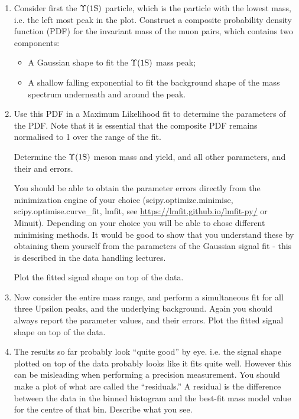 \begin{enumerate}
\item Consider first the $\Upsilon \rm (1S)$ particle, which is the particle with the lowest mass, i.e. the left most  peak in the plot. Construct a composite probability density function (PDF) for the invariant mass of the muon pairs, which contains two components:
\begin{itemize}
\item A Gaussian shape to fit the  $\Upsilon \rm (1S)$ mass peak;
\item A shallow falling exponential to fit the background shape of the mass spectrum underneath and around the peak.
\end{itemize}

\item Use this PDF in a Maximum Likelihood fit to determine the parameters of the PDF. Note that it is essential that the composite PDF remains normalised to 1 over the range of the fit.

Determine the $\Upsilon \rm (1S)$  meson mass and yield, and all other parameters, and their and errors.

You should be able to obtain the parameter errors directly from the minimization engine of your choice (scipy.optimize.minimise, scipy.optimise.curve\_fit, lmfit, see \url{https://lmfit.github.io/lmfit-py/} or Minuit). Depending on your choice you will be able to chose different minimising methods.
It would be good to show that you understand these by obtaining them yourself from the parameters of the Gaussian signal fit - this is described in the data handling lectures.

Plot the fitted signal shape on top of the data.

\item Now consider the entire mass range, and perform a simultaneous fit for all three Upsilon peaks, and the underlying background. Again you should always report the parameter values, and their errors. Plot the fitted signal shape on top of the data.

\item The results so far probably look ``quite good'' by eye.  i.e. the signal shape plotted on top of the data probably looks like it fits quite well.  However this can be misleading when performing a precision measurement.  You should make a plot of what are called the ``residuals.'' A residual is the difference between the data in the binned histogram and the best-fit mass model value for the centre of that bin. Describe what you see.


\end{enumerate}
